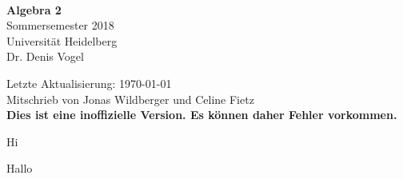 \documentclass[a4paper, 12pt]{article}
\begin{document}
\begin{titlepage}
	
	\begin{center}
		\ \\ 
		\vspace{4cm}
		{\huge{\bf Algebra 2}}\\
		\vspace{0.8cm}
		{\Large Sommersemester 2018}\\
		\vspace{0.5cm}
		{\Large Universit\"at Heidelberg}
		\\
		\vspace{1cm}
		{\sc Dr. Denis Vogel}
		\vspace{2cm}
		\normalsize{
			\begin{center}
				Letzte Aktualisierung: \today\\
				Mitschrieb von Jonas Wildberger und Celine Fietz\\
				\textbf{Dies ist eine inoffizielle Version. Es können daher Fehler vorkommen.}
			\end{center}
		}
	\end{center}
	
\end{titlepage}
\tableofcontents
Hi


Hallo
\end{document}
